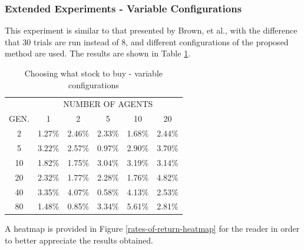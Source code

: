 \documentclass[a4paper,twoside]{article}
\begin{document}
\subsubsection{Extended Experiments - Variable Configurations}

This experiment is similar to that presented by Brown, et al., with
the difference that 30 trials are run instead of 8, and different
configurations of the proposed method are used. The results are shown
in Table \ref{table-rates-of-return}. 

\begin{table}
  \caption{{Choosing what stock to buy - variable configurations}
  }
  \centering
\label{table-rates-of-return}
    \begin{tabular}{ c c c c c c }
         & \multicolumn{5}{c}{NUMBER OF AGENTS} \\ 
        GEN. & 1      & 2      & 5      & 10     & 20     \\
        2       & 1.27\% & 2.46\% & 2.33\% & 1.68\% & 2.44\% \\ 
        5       & 3.22\% & 2.57\% & 0.97\% & 2.90\% & 3.70\% \\ 
        10      & 1.82\% & 1.75\% & 3.04\% & 3.19\% & 3.14\% \\ 
        20      & 2.32\% & 1.77\% & 2.28\% & 1.76\% & 4.82\% \\ 
        40      & 3.35\% & 4.07\% & 0.58\% & 4.13\% & 2.53\% \\ 
        80      & 1.48\% & 0.85\% & 3.34\% & 5.61\% & 2.81\% \\ 
    \end{tabular} 
\end{table}

A heatmap is provided in Figure \ref{rates-of-return-heatmap} for the reader in order to better appreciate the results obtained.


\end{document}
